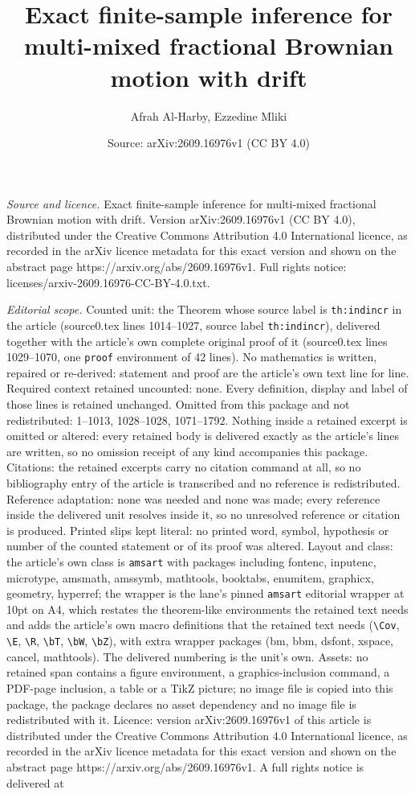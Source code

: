 \documentclass[10pt,a4paper]{amsart}
\title[Exact finite-sample inference for multi-mixed fractional Bro]{Exact finite-sample inference for multi-mixed fractional Brownian motion with drift}
\author{Afrah Al-Harby, Ezzedine Mliki}
\date{Source: arXiv:2609.16976v1 (CC BY 4.0)}
\begin{document}
\maketitle

\noindent\emph{Source and licence.} Exact finite-sample inference for multi-mixed fractional Brownian motion with drift. Version arXiv:2609.16976v1 (CC BY 4.0), distributed under the Creative Commons Attribution 4.0 International licence, as recorded in the arXiv licence metadata for this exact version and shown on the abstract page https://arxiv.org/abs/2609.16976v1. Full rights notice: licenses/arxiv-2609.16976-CC-BY-4.0.txt.\par\smallskip

\noindent\textit{Editorial scope.} Counted unit: the Theorem whose source label is \texttt{th:indincr} in the article (source0.tex lines 1014--1027, source label \texttt{th:indincr}), delivered together with the article's own complete original proof of it (source0.tex lines 1029--1070, one \texttt{proof} environment of 42 lines). No mathematics is written, repaired or re-derived: statement and proof are the article's own text line for line. Required context retained uncounted: none. Every definition, display and label of those lines is retained unchanged. Omitted from this package and not redistributed: 1--1013, 1028--1028, 1071--1792. Nothing inside a retained excerpt is omitted or altered: every retained body is delivered exactly as the article's lines are written, so no omission receipt of any kind accompanies this package. Citations: the retained excerpts carry no citation command at all, so no bibliography entry of the article is transcribed and no reference is redistributed. Reference adaptation: none was needed and none was made; every reference inside the delivered unit resolves inside it, so no unresolved reference or citation is produced. Printed slips kept literal: no printed word, symbol, hypothesis or number of the counted statement or of its proof was altered. Layout and class: the article's own class is \texttt{amsart} with packages including fontenc, inputenc, microtype, amsmath, amssymb, mathtools, booktabs, enumitem, graphicx, geometry, hyperref; the wrapper is the lane's pinned \texttt{amsart} editorial wrapper at 10pt on A4, which restates the theorem-like environments the retained text needs and adds the article's own macro definitions that the retained text needs (\texttt{\textbackslash Cov}, \texttt{\textbackslash E}, \texttt{\textbackslash R}, \texttt{\textbackslash bT}, \texttt{\textbackslash bW}, \texttt{\textbackslash bZ}), with extra wrapper packages (bm, bbm, dsfont, xspace, cancel, mathtools). The delivered numbering is the unit's own. Assets: no retained span contains a figure environment, a graphics-inclusion command, a PDF-page inclusion, a table or a TikZ picture; no image file is copied into this package, the package declares no asset dependency and no image file is redistributed with it. Licence: version arXiv:2609.16976v1 of this article is distributed under the Creative Commons Attribution 4.0 International licence, as recorded in the arXiv licence metadata for this exact version and shown on the abstract page https://arxiv.org/abs/2609.16976v1. A full rights notice is delivered at 
\end{document}

